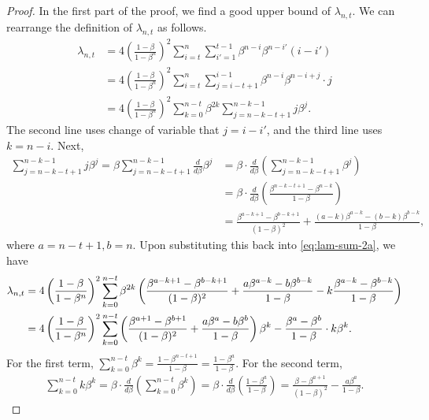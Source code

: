\begin{proof}
In the first part of the proof, we find a good upper bound of $\lambda_{n,t}$. We can rearrange the definition of $\lambda_{n,t}$ as follows.
\begin{align}
    \lambda_{n,t}
    &= 4\left(\frac{1-\beta}{1-\beta^n}\right)^2 \sum_{i=t}^n\sum_{i'=1}^{t-1} \beta^{n-i}\beta^{n-i'}(i-i') \tag{let $j=i-i'$}\\
    &= 4\left(\frac{1-\beta}{1-\beta^n}\right)^2 \sum_{i=t}^n\sum_{j=i-t+1}^{i-1} \beta^{n-i}\beta^{n-i+j}\cdot j \tag{let $k=n-i$}\\
    &= 4\left(\frac{1-\beta}{1-\beta^n}\right)^2 \sum_{k=0}^{n-t} \beta^{2k} \sum_{j=n-k-t+1}^{n-k-1} j\beta^j.
    \label{eq:lam-sum-2a}
\end{align}
The second line uses change of variable that $j=i-i'$, and the third line uses $k=n-i$. Next, 
\begin{align*}
    \sum_{j=n-k-t+1}^{n-k-1} j\beta^j
    = \beta\sum_{j=n-k-t+1}^{n-k-1} \frac{d}{d\beta} \beta^j 
    &= \beta\cdot \frac{d}{d\beta} \left( \sum_{j=n-k-t+1}^{n-k-1} \beta^j \right) \\
    &= \beta\cdot \frac{d}{d\beta} \left( \frac{\beta^{n-k-t+1} - \beta^{n-k}}{1-\beta} \right) \\
    &= \frac{\beta^{a-k+1}-\beta^{b-k+1}}{(1-\beta)^2} + \frac{(a-k)\beta^{a-k} - (b-k)\beta^{b-k}}{1-\beta},
\end{align*}
where $a=n-t+1, b=n$. Upon substituting this back into \eqref{eq:lam-sum-2a}, we have
\begin{align}
    \lambda_{n,t}
    &= 4\left(\frac{1-\beta}{1-\beta^n}\right)^2 \sum_{k=0}^{n-t} \beta^{2k}\left( \frac{\beta^{a-k+1} - \beta^{b-k+1}}{(1-\beta)^2} + \frac{a\beta^{a-k}-b\beta^{b-k}}{1-\beta} - k \frac{\beta^{a-k}-\beta^{b-k}}{1-\beta} \right) \notag\\
    &= 4\left(\frac{1-\beta}{1-\beta^n}\right)^2 \sum_{k=0}^{n-t} \left( \frac{\beta^{a+1} - \beta^{b+1}}{(1-\beta)^2} + \frac{a\beta^{a}-b\beta^{b}}{1-\beta} \right) \beta^k - \frac{\beta^a-\beta^b}{1-\beta} \cdot k\beta^k.
    \label{eq:lam-sum-2b}
\end{align}
For the first term, $\sum_{k=0}^{n-t}\beta^k = \frac{1-\beta^{n-t+1}}{1-\beta} = \frac{1-\beta^a}{1-\beta}$. For the second term,
\begin{align*}
    \sum_{k=0}^{n-t} k\beta^k
    = \beta \cdot \frac{d}{d\beta} \left( \sum_{k=0}^{n-t}\beta^k \right) 
    = \beta \cdot \frac{d}{d\beta} \left( \frac{1-\beta^a}{1-\beta} \right) 
    = \frac{\beta-\beta^{a+1}}{(1-\beta)^2} - \frac{a\beta^a}{1-\beta}.

\end{align*}
\end{proof}
